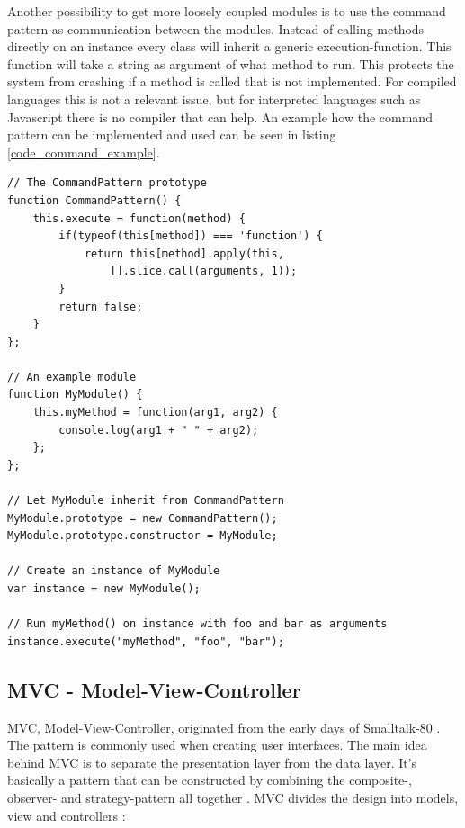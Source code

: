 Another possibility to get more loosely coupled modules is to use the command pattern as communication between the modules. Instead of calling methods directly on an instance every class will inherit a generic execution-function. This function will take a string as argument of what method to run. This protects the system from crashing if a method is called that is not implemented. For compiled languages this is not a relevant issue, but for interpreted languages such as Javascript there is no compiler that can help. An example how the command pattern can be implemented and used can be seen in listing \ref{code_command_example}.

\lstset{frame=single, caption=An example of how the command pattern can be implemented and used in Javascript., label=code_command_example, captionpos=b, tabsize=2}
\begin{framed}
\begin{lstlisting}
// The CommandPattern prototype
function CommandPattern() {
	this.execute = function(method) {
		if(typeof(this[method]) === 'function') {
			return this[method].apply(this,
				[].slice.call(arguments, 1));
		}
		return false;
	}
};

// An example module
function MyModule() {
	this.myMethod = function(arg1, arg2) {
		console.log(arg1 + " " + arg2);
	};
};

// Let MyModule inherit from CommandPattern
MyModule.prototype = new CommandPattern();
MyModule.prototype.constructor = MyModule;

// Create an instance of MyModule
var instance = new MyModule();

// Run myMethod() on instance with foo and bar as arguments
instance.execute("myMethod", "foo", "bar");
\end{lstlisting}
\end{framed}

\subsection{MVC - Model-View-Controller}

MVC, Model-View-Controller, originated from the early days of Smalltalk-80 \cite[p. 4]{elem_reuse_oo}. The pattern is commonly used when creating user interfaces. The main idea behind MVC is to separate the presentation layer from the data layer. It's basically a pattern that can be constructed by combining the composite-, observer- and strategy-pattern all together \cite{head_first}. MVC divides the design into models, view and controllers \cite[p. 14]{elem_reuse_oo}:

